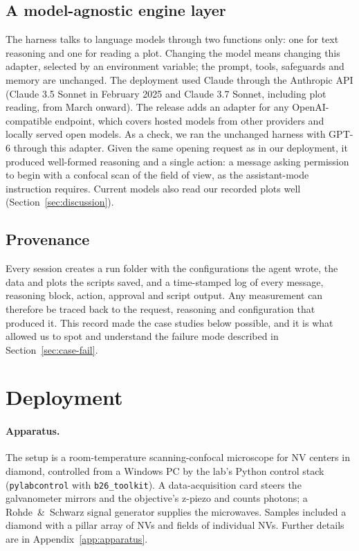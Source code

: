 \documentclass[10pt]{article}
\newcommand{\code}[1]{\texttt{#1}}
\begin{document}
\subsection{A model-agnostic engine layer}
\label{sec:engine}
The harness talks to language models through two functions only: one for text reasoning and one for reading a plot.
Changing the model means changing this adapter, selected by an environment variable; the prompt, tools, safeguards and memory are unchanged.
The deployment used Claude through the Anthropic API (Claude 3.5 Sonnet in February 2025 and Claude 3.7 Sonnet, including plot reading, from March onward).
The release adds an adapter for any OpenAI-compatible endpoint, which covers hosted models from other providers and locally served open models.
As a check, we ran the unchanged harness with GPT-6 through this adapter. Given the same opening request as in our deployment, it produced well-formed reasoning and a single action: a message asking permission to begin with a confocal scan of the field of view, as the assistant-mode instruction requires. Current models also read our recorded plots well (Section~\ref{sec:discussion}).

\subsection{Provenance}
Every session creates a run folder with the configurations the agent wrote, the data and plots the scripts saved, and a time-stamped log of every message, reasoning block, action, approval and script output.
Any measurement can therefore be traced back to the request, reasoning and configuration that produced it.
This record made the case studies below possible, and it is what allowed us to spot and understand the failure mode described in Section~\ref{sec:case-fail}.

\section{Deployment}
\label{sec:deployment}

\paragraph{Apparatus.}
The setup is a room-temperature scanning-confocal microscope for NV centers in diamond, controlled from a Windows PC by the lab's Python control stack (\code{pylabcontrol} with \code{b26\_toolkit}).
A data-acquisition card steers the galvanometer mirrors and the objective's z-piezo and counts photons; a Rohde~\&~Schwarz signal generator supplies the microwaves.
Samples included a diamond with a pillar array of NVs and fields of individual NVs.
Further details are in Appendix~\ref{app:apparatus}.
\end{document}
